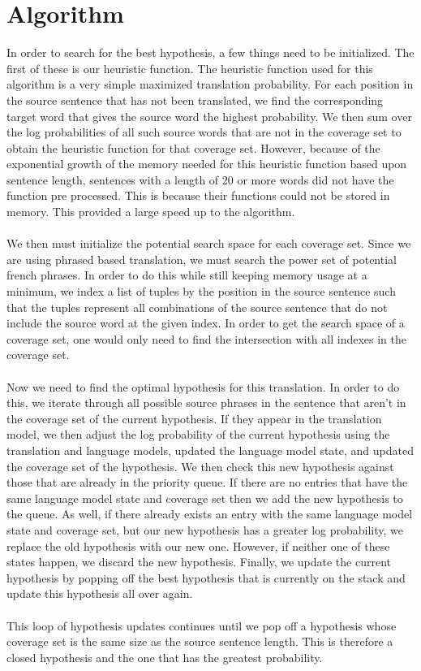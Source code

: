 \documentclass[11pt]{article}
\begin{document}
\section{Algorithm}
In order to search for the best hypothesis, a few things need to be initialized. The first of these is our heuristic function. The heuristic function used for this algorithm is a very simple maximized translation probability. For each position in the source sentence that has not been translated, we find the corresponding target word that gives the source word the highest probability. We then sum over the log probabilities of all such source words that are not in the coverage set to obtain the heuristic function for that coverage set. However, because of the exponential growth of the memory needed for this heuristic function based upon sentence length, sentences with a length of 20 or more words did not have the function pre processed. This is because their functions could not be stored in memory. This provided a large speed up to the algorithm.\\\\
We then must initialize the potential search space for each coverage set. Since we are using phrased based translation, we must search the power set of potential french phrases. In order to do this while still keeping memory usage at a minimum, we index a list of tuples by the position in the source sentence such that the tuples represent all combinations of the source sentence that do not include the source word at the given index. In order to get the search space of a coverage set, one would only need to find the intersection with all indexes in the coverage set.\\\\
Now we need to find the optimal hypothesis for this translation. In order to do this, we iterate through all possible source phrases in the sentence that aren't in the coverage set of the current hypothesis. If they appear in the translation model, we then adjust the log probability of the current hypothesis using the translation and language models, updated the language model state, and updated the coverage set of the hypothesis. We then check this new hypothesis against those that are already in the priority queue. If there are no entries that have the same language model state and coverage set then we add the new hypothesis to the queue. As well, if there already exists an entry with the same language model state and coverage set, but our new hypothesis has a greater log probability, we replace the old hypothesis with our new one. However, if neither one of these states happen, we discard the new hypothesis. Finally, we update the current hypothesis by popping off the best hypothesis that is currently on the stack and update this hypothesis all over again. \\\\
This loop of hypothesis updates continues until we pop off a hypothesis whose coverage set is the same size as the source sentence length. This is therefore a closed hypothesis and the one that has the greatest probability.
\end{document}
